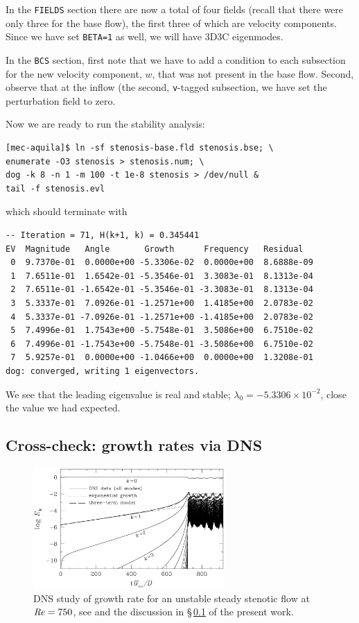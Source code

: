 \documentclass[11pt,a4paper]{report}
\newcommand\Rey{\mbox{\textit{Re}}}
\begin{document}
In the \verb+FIELDS+ section there are now a total of four fields
(recall that there were only three for the base flow), the first three
of which are velocity components.  Since we have set \verb+BETA=1+ as
well, we will have 3D3C eigenmodes.

In the \verb+BCS+ section, first note that we have to add a condition
to each subsection for the new velocity component, $w$, that was not
present in the base flow. Second, observe that at the inflow (the
second, \verb+v+-tagged subsection, we have set the perturbation field
to zero.

Now we are ready to run the stability analysis:
\begin{verbatim}
[mec-aquila]$ ln -sf stenosis-base.fld stenosis.bse; \
enumerate -O3 stenosis > stenosis.num; \
dog -k 8 -n 1 -m 100 -t 1e-8 stenosis > /dev/null &
tail -f stenosis.evl
\end{verbatim}
which should terminate with
{\small
\begin{verbatim}
-- Iteration = 71, H(k+1, k) = 0.345441
EV  Magnitude   Angle       Growth      Frequency   Residual
 0  9.7370e-01  0.0000e+00 -5.3306e-02  0.0000e+00  8.6888e-09
 1  7.6511e-01  1.6542e-01 -5.3546e-01  3.3083e-01  8.1313e-04
 2  7.6511e-01 -1.6542e-01 -5.3546e-01 -3.3083e-01  8.1313e-04
 3  5.3337e-01  7.0926e-01 -1.2571e+00  1.4185e+00  2.0783e-02
 4  5.3337e-01 -7.0926e-01 -1.2571e+00 -1.4185e+00  2.0783e-02
 5  7.4996e-01  1.7543e+00 -5.7548e-01  3.5086e+00  6.7510e-02
 6  7.4996e-01 -1.7543e+00 -5.7548e-01 -3.5086e+00  6.7510e-02
 7  5.9257e-01  0.0000e+00 -1.0466e+00  0.0000e+00  1.3208e-01
dog: converged, writing 1 eigenvectors.
\end{verbatim}
}\noindent We see that the leading eigenvalue is real and stable;
$\lambda_0=-5.3306\times10^{-2}$, close the value we had expected.


\subsection{Cross-check: growth rates via DNS}
\label{sec.check}

\begin{figure}
\begin{center}
\includegraphics[width=0.65\textwidth]{StenGrow}
\end{center}
\caption{DNS study of growth rate for an unstable steady stenotic flow
  at $\Rey=750$, see \citet{shbl05} and the discussion in
  \S\,\ref{sec.check} of the present work.  }
\label{fig.stengrow}
\end{figure}
\end{document}

